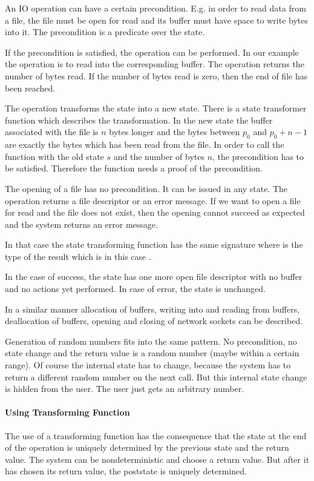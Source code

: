 An IO operation can have a certain precondition. E.g. in order to read data from
a file, the file must be open for read and its buffer must have space to write
bytes into it. The precondition is a predicate over the state.

If the precondition is satisfied, the operation can be performed. In our example
the operation is to read into the corresponding buffer. The operation returns
the number of bytes read. If the number of bytes read is zero, then the end of
file has been reached.

The operation transforms the state into a new state. There is a state
transformer function  which
describes the transformation. In the new state the buffer associated with the
file is $n$ bytes longer and the bytes between $p_0$ and $p_0 + n - 1$ are
exactly the bytes which has been read from the file. In order to call the
function with the old state $s$ and the number of bytes $n$, the precondition
has to be satisfied. Therefore the function needs a proof of the precondition.


The opening of a file has no precondition. It can be issued in any state. The
operation returns a file descriptor or an error message. If we want to open a
file for read and the file does not exist, then the opening cannot succeed as
expected and the system returns an error message.

In that case the state transforming function has the same signature  where  is the type of the result which
is in this case .

In the case of success, the state has one more open file descriptor with no
buffer and no actions yet performed. In case of error, the state is unchanged.

In a similar manner allocation of buffers, writing into and reading from
buffers, deallocation of buffers, opening and closing of network sockets can be
described.

Generation of random numbers fits into the same pattern. No precondition, no
state change and the return value is a random number (maybe within a certain
range). Of course the internal state has to change, because the system has to
return a different random number on the next call. But this internal state
change is hidden from the user. The user just gets an arbitrary number.



\paragraph{Using Transforming Function} The use of a transforming function
 has the consequence that the state
at the end of the operation is uniquely determined by the previous state and the
return value. The system can be nondeterministic and choose a return value. But
after it has chosen its return value, the poststate is uniquely determined.

